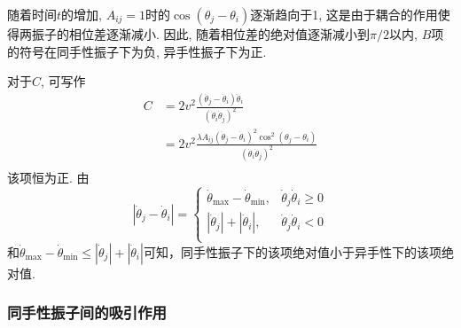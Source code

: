 \documentclass{article}
\begin{document}
随着时间$t$的增加, $A_{ij}=1$时的$\cos \left( \theta _j-\theta _i \right)$逐渐趋向于1, 这是由于耦合的作用使得两振子的相位差逐渐减小. 因此, 随着相位差的绝对值逐渐减小到$\pi/2$以内, $B$项的符号在同手性振子下为负, 异手性振子下为正.

对于$C$, 可写作
$$
\begin{aligned}
	C&=2v^2\frac{\left( \dot{\theta}_j-\dot{\theta}_i \right) \ddot{\theta}_i}{\left( \dot{\theta}_i\dot{\theta}_j \right) ^2}\\
	&=2v^2\frac{\lambda A_{ij}\left( \dot{\theta}_j-\dot{\theta}_i \right) ^2\cos ^2\left( \theta _j-\theta _i \right)}{\left( \dot{\theta}_i\dot{\theta}_j \right) ^2}\\
\end{aligned}
$$
该项恒为正. 
由$$
\left| \dot{\theta}_j-\dot{\theta}_i \right|=\begin{cases}
	\dot{\theta}_{\max}-\dot{\theta}_{\min},&		\dot{\theta}_j\dot{\theta}_i\geqslant 0\\
	\left| \dot{\theta}_j \right|+\left| \dot{\theta}_i \right|,&		\dot{\theta}_j\dot{\theta}_i<0\\
\end{cases}
$$和$
\dot{\theta}_{\max}-\dot{\theta}_{\min}\leqslant \left| \dot{\theta}_j \right|+\left| \dot{\theta}_i \right|
$可知，同手性振子下的该项绝对值小于异手性下的该项绝对值.

\subsubsection{同手性振子间的吸引作用}
\end{document}
